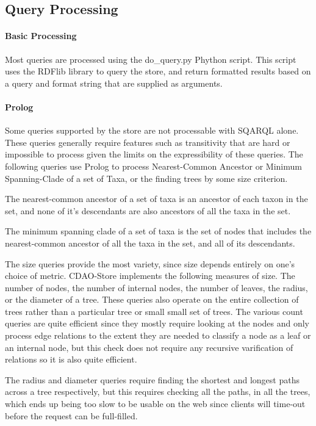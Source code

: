 \documentclass[10pt]{article}
\begin{document}
  \subsection{Query Processing}
     \paragraph{Basic Processing} Most queries are processed using the do\_query.py Phython script. This script uses the RDFlib
     library to query the store, and return formatted results based on a query and format string that
     are supplied as arguments.
     
     \paragraph{Prolog} Some queries supported by the store are not processable with SQARQL alone. These queries generally
      require features such as transitivity that are hard or impossible to process given the limits on the expressibility 
      of these queries. The following queries use Prolog to process Nearest-Common Ancestor or Minimum Spanning-Clade of a
      set of Taxa, or the finding trees by some size criterion. 

      The nearest-common ancestor of a set of taxa is an ancestor of each taxon in the set, and none of it's descendants are also
      ancestors of all the taxa in the set. 
      
       The minimum spanning clade of a set of taxa is the set of nodes that includes the nearest-common ancestor of all the taxa
       in the set, and all of its descendants.

       The size queries provide the most variety, since size depends entirely on one's choice of metric. CDAO-Store implements the
       following measures of size. The number of nodes, the number of internal nodes, the number of leaves, the radius, or the diameter
       of a tree. These queries also operate on the entire collection of trees rather than a particular tree or small small set of trees.
       The various count queries are quite efficient since they mostly require looking at the nodes and only process edge relations to the
       extent they are needed to classify a node as a leaf or an internal node, but this check does not require any recursive varification
       of relations so it is also quite efficient.

       The radius and diameter queries require finding the shortest and longest paths across a tree respectively, but this requires checking all
       the paths, in all the trees, which ends up being too slow to be usable on the web since clients will time-out before the request can
       be full-filled. 
\end{document}
